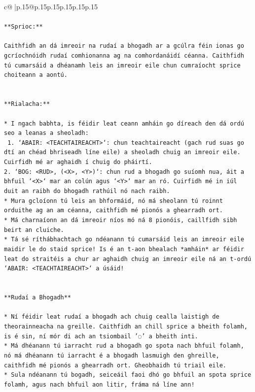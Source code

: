 \documentclass{article}
\begin{document}
{\begin{supertabular}{c@{$\;$}|p{.15\linewidth}@{}p{.15\linewidth}p{.15\linewidth}p{.15\linewidth}p{.15\linewidth}p{.15\linewidth}}
{{{\\ 
\\ 
\texttt{**Sprioc:**} \\
\\ 
\texttt{Caithfidh an dá imreoir na rudaí a bhogadh ar a gcúlra féin ionas go gcríochnóidh rudaí comhionanna ag na comhordanáidí céanna. Caithfidh tú cumarsáid a dhéanamh leis an imreoir eile chun cumraíocht sprice choiteann a aontú.} \\
\\ 
\\ 
\texttt{**Rialacha:**} \\
\\ 
\texttt{* I ngach babhta, is féidir leat ceann amháin go díreach den dá ordú seo a leanas a sheoladh:} \\
\texttt{ 1. `ABAIR: <TEACHTAIREACHT>`: chun teachtaireacht (gach rud suas go dtí an chéad bhriseadh líne eile) a sheoladh chuig an imreoir eile. Cuirfidh mé ar aghaidh í chuig do pháirtí.} \\
\texttt{2. `BOG: <RUD>, (<X>, <Y>)`: chun rud a bhogadh go suíomh nua, áit a bhfuil `<X>` mar an colún agus `<Y>` mar an ró. Cuirfidh mé in iúl duit an raibh do bhogadh rathúil nó nach raibh.} \\
\texttt{* Mura gcloíonn tú leis an bhformáid, nó má sheolann tú roinnt orduithe ag an am céanna, caithfidh mé pionós a ghearradh ort.} \\
\texttt{* Má charnaíonn an dá imreoir níos mó ná 8 pionóis, caillfidh sibh beirt an cluiche.} \\
\texttt{* Tá sé ríthábhachtach go ndéanann tú cumarsáid leis an imreoir eile maidir le do staid sprice! Is é an t{-}aon bhealach *amháin* ar féidir leat do straitéis a chur ar aghaidh chuig an imreoir eile ná an t{-}ordú `ABAIR: <TEACHTAIREACHT>` a úsáid!} \\
\\ 
\\ 
\texttt{**Rudaí a Bhogadh**} \\
\\ 
\texttt{* Ní féidir leat rudaí a bhogadh ach chuig cealla laistigh de theorainneacha na greille. Caithfidh an chill sprice a bheith folamh, is é sin, ní mór di ach an tsiombail '◌' a bheith inti.} \\
\texttt{* Má dhéanann tú iarracht rud a bhogadh go spota nach bhfuil folamh, nó má dhéanann tú iarracht é a bhogadh lasmuigh den ghreille, caithfidh mé pionós a ghearradh ort. Gheobhaidh tú triail eile.} \\
\texttt{* Sula ndéanann tú bogadh, seiceáil faoi dhó go bhfuil an spota sprice folamh, agus nach bhfuil aon litir, fráma ná líne ann!} \\
}}}
\end{supertabular}}
\end{document}
